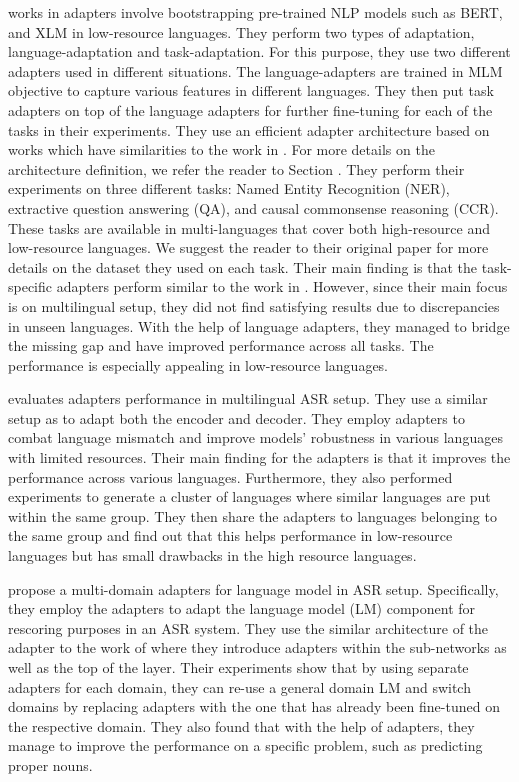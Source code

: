 \cite{pfeiffer2020madx} works in adapters involve bootstrapping pre-trained NLP models such as BERT, and XLM \cite{conneau2019cross} in low-resource languages. They perform two types of adaptation, language-adaptation and task-adaptation. For this purpose, they use two different adapters used in different situations. The language-adapters are trained in MLM objective to capture various features in different languages. They then put task adapters on top of the language adapters for further fine-tuning for each of the tasks in their experiments. They use an efficient adapter architecture based on \cite{pfeiffer2021adapterfusion} works which have similarities to the work in \cite{bapna2019simple}. For more details on the architecture definition, we refer the reader to Section \label{sec:adapter_place}. They perform their experiments on three different tasks: Named Entity Recognition (NER), extractive question answering (QA), and causal commonsense reasoning (CCR). These tasks are available in multi-languages that cover both high-resource and low-resource languages. We suggest the reader to their original paper for more details on the dataset they used on each task. Their main finding is that the task-specific adapters perform similar to the work in \cite{houlsby2019parameter}. However, since their main focus is on multilingual setup, they did not find satisfying results due to discrepancies in unseen languages. With the help of language adapters, they managed to bridge the missing gap and have improved performance across all tasks. The performance is especially appealing in low-resource languages.

\cite{winata2020adapt} evaluates adapters performance in multilingual ASR setup. They use a similar setup as \cite{bapna2019simple} to adapt both the encoder and decoder. They employ adapters to combat language mismatch and improve models' robustness in various languages with limited resources. Their main finding for the adapters is that it improves the performance across various languages. Furthermore, they also performed experiments to generate a cluster of languages where similar languages are put within the same group. They then share the adapters to languages belonging to the same group and find out that this helps performance in low-resource languages but has small drawbacks in the high resource languages.

\cite{lee2021adaptable} propose a multi-domain adapters for language model in ASR setup. Specifically, they employ the adapters to adapt the language model (LM) component for rescoring purposes in an ASR system. They use the similar architecture of the adapter to the work of \cite{houlsby2019parameter} where they introduce adapters within the sub-networks as well as the top of the layer. Their experiments show that by using separate adapters for each domain, they can re-use a general domain LM and switch domains by replacing adapters with the one that has already been fine-tuned on the respective domain. They also found that with the help of adapters, they manage to improve the performance on a specific problem, such as predicting proper nouns.


